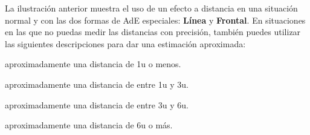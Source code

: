 %
\noindent
La ilustración anterior muestra el uso de un efecto a distancia en una situación normal y con las dos formas de AdE especiales: \textbf{Línea} y \textbf{Frontal}. En situaciones en las que no puedas medir las distancias con precisión, también puedes utilizar las siguientes descripciones para dar una estimación aproximada:
%
\pagebreak
%
\begin{description}[leftmargin=*]
 \item[\accf{Adyacente}:] aproximadamente una distancia de 1u o menos. \item[\accf{Cerca}:] aproximadamente una distancia de entre 1u y 3u. \item[\accf{Media distancia}:] aproximadamente una distancia de entre 3u y 6u. \item[\accf{Lejos}:] aproximadamente una distancia de 6u o más.
\end{description}
